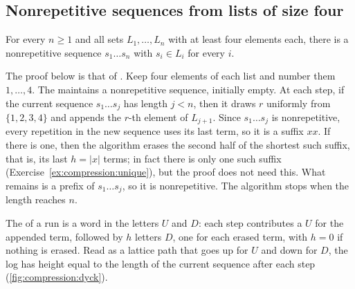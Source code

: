 \begin{refsection}
\subsection{Nonrepetitive sequences from lists of size four}\label{sec:compression:nonrep}

\begin{theorem}\label{thm:compression:nonrep}
For every $n\ge1$ and all sets $L_1,\dots,L_n$ with at least four elements each, there is a nonrepetitive sequence $s_1\dots s_n$ with $s_i\in L_i$ for every $i$.
\end{theorem}

The proof below is that of \textcite{GrytczukKozikMicek2013}. Keep four elements of each list and number them $1,\dots,4$. The  maintains a nonrepetitive sequence, initially empty. At each step, if the current sequence $s_1\dots s_j$ has length $j<n$, then it draws $r$ uniformly from $\{1,2,3,4\}$ and appends the $r$-th element of $L_{j+1}$. Since $s_1\dots s_j$ is nonrepetitive, every repetition in the new sequence uses its last term, so it is a suffix $xx$. If there is one, then the algorithm erases the second half of the shortest such suffix, that is, its last $h=|x|$ terms; in fact there is only one such suffix (Exercise~\ref{ex:compression:unique}), but the proof does not need this. What remains is a prefix of $s_1\dots s_j$, so it is nonrepetitive. The algorithm stops when the length reaches $n$.

The  of a run is a word in the letters $U$ and $D$: each step contributes a $U$ for the appended term, followed by $h$ letters $D$, one for each erased term, with $h=0$ if nothing is erased. Read as a lattice path that goes up for $U$ and down for $D$, the log has height equal to the length of the current sequence after each step (\cref{fig:compression:dyck}).


\end{refsection}
